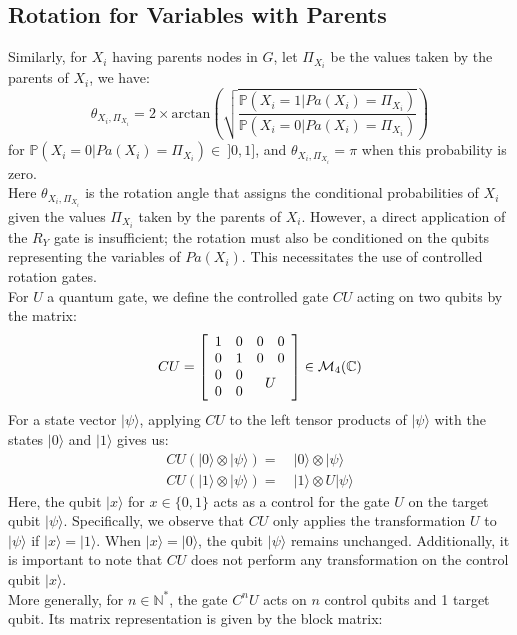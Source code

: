 \subsection{Rotation for Variables with Parents}
\label{multi_rotation_calc}
Similarly, for $X_i$ having parents nodes in $G$, let $\Pi_{X_i}$ be the values taken by the parents of $X_i$, we have:
\[
\theta_{X_i,\Pi_{X_i}} = 
2\times\mathrm{arctan}\left(\sqrt{\frac{\displaystyle \mathbb{P}(X_i=1|Pa(X_i)=\Pi_{X_i})}{\displaystyle \mathbb{P}(X_i=0|Pa(X_i)=\Pi_{X_i})}}\right) 
\]
for $\mathbb{P}(X_i=0|Pa(X_i)=\Pi_{X_i}) \in \ ]0,1]$, and
$\theta_{X_i,\Pi_{X_i}} =  \pi$ when this probability is zero.
\\[5pt]
Here $\theta_{X_i,\Pi_{X_i}}$ is the rotation angle that assigns the conditional probabilities of $X_i$ given the values $\Pi_{X_i}$ taken by the parents of $X_i$. However, a direct application of the $R_Y$ gate is insufficient; the rotation must also be conditioned on the qubits representing the variables of $Pa(X_i)$.
This necessitates the use of controlled rotation gates.
\\[5pt]
For $U$ a quantum gate, we define the controlled gate $CU$ acting on two qubits by the matrix:
\[CU =
\left[
\begin{array}{cccc}
    1 & 0 & 0 & 0 \\
    0 & 1 & 0 & 0 \\
    0 & 0 & \multicolumn{2}{c}{\smash{\raisebox{-.5\normalbaselineskip}{$U$}}} \\
    0 & 0 &  & 
\end{array}
\right]
\in \mathcal{M}_{4}(\mathbb{C})
\]
For a state vector $|\psi\rangle$, applying $CU$ to the left tensor products of $|\psi\rangle$ with the states $|0\rangle$ and $|1\rangle$ gives us:
\begin{align*}
CU (|0\rangle \otimes |\psi\rangle) =&\ |0\rangle \otimes |\psi\rangle \\
CU (|1\rangle \otimes |\psi\rangle) =&\ |1\rangle \otimes U|\psi\rangle 
\end{align*}
Here, the qubit $|x\rangle$ for $x\in\{0,1\}$ acts as a control for the gate $U$ on the target qubit $|\psi\rangle$. Specifically, we observe that $CU$ only applies the transformation $U$ to $|\psi\rangle$ if $|x\rangle = |1\rangle$. When $|x\rangle = |0\rangle$, the qubit $|\psi\rangle$ remains unchanged. Additionally, it is important to note that $CU$ does not perform any transformation on the control qubit $|x\rangle$. 
\\[5pt]
More generally, for $n\in\mathbb{N}^*$, the gate $C^nU$ acts on $n$ control qubits and 1 target qubit. Its matrix representation is given by the block matrix:
